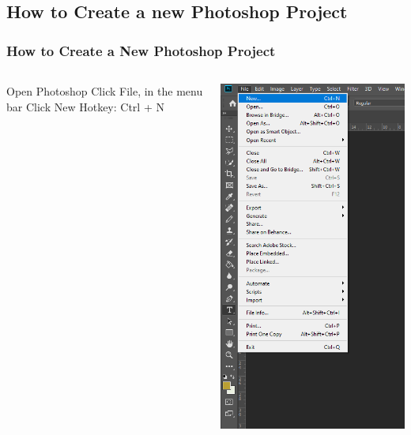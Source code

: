 \documentclass{beamer}
\begin{document}
			\subsection{How to Create a new Photoshop Project}		
	\begin{frame}
		\frametitle{How to Create a New Photoshop Project}
	\begin{columns}
	\vspace{-15pt}
	\begin{outline}
		\1 Open Photoshop
		\1 Click File, in the menu bar
		\1 Click New
		\1 Hotkey:  Ctrl + N
	\end{outline}
	\includegraphics[width=.7\textwidth]{images/new project 1.png}
\end{columns}
		\end{frame}
\end{document}
